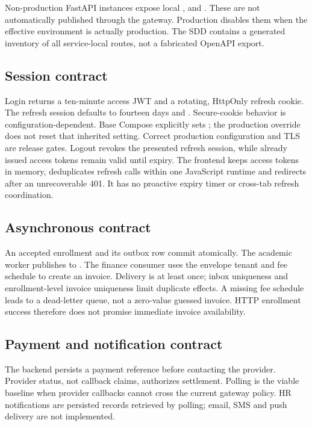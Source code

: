 \documentclass[10pt,a4paper]{article}
\begin{document}
Non-production FastAPI instances expose local , 
and . These are not automatically published through the gateway.
Production disables them when the effective environment is actually production.
The SDD contains a generated inventory of all service-local routes, not a fabricated
OpenAPI export.

\subsection{Session contract}
Login returns a ten-minute access JWT and a rotating, HttpOnly refresh cookie.
The refresh session defaults to fourteen days and .
Secure-cookie behavior is configuration-dependent. Base Compose explicitly sets
; the production override does not reset that
inherited setting. Correct production configuration and TLS are release gates.
Logout revokes the presented refresh session, while already issued access tokens
remain valid until expiry. The frontend keeps access tokens in memory, deduplicates refresh calls within one
JavaScript runtime and redirects after an unrecoverable 401. It has no proactive
expiry timer or cross-tab refresh coordination.

\subsection{Asynchronous contract}
An accepted enrollment and its outbox row commit atomically. The academic worker
publishes  to .
The finance consumer uses the envelope tenant and fee schedule to create an invoice.
Delivery is at least once; inbox uniqueness and enrollment-level invoice uniqueness
limit duplicate effects. A missing fee schedule leads to a dead-letter queue, not a
zero-value guessed invoice. HTTP enrollment success therefore does not promise
immediate invoice availability.

\subsection{Payment and notification contract}
The backend persists a payment reference before contacting the provider. Provider
status, not callback claims, authorizes settlement. Polling is the viable baseline
when provider callbacks cannot cross the current gateway policy. HR notifications
are persisted records retrieved by polling; email, SMS and push delivery are not
implemented.
\end{document}
